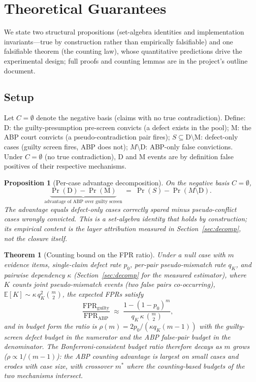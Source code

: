 \documentclass[11pt]{article}
\newtheorem{theorem}{Theorem}
\newtheorem{proposition}{Proposition}
\newcommand{\dd}{\mathrm{D}}
\newcommand{\mm}{\mathrm{M}}
\newcommand{\cset}{C}
\begin{document}
\section{Theoretical Guarantees}\label{sec:theory}

We state two structural propositions (set-algebra identities and
implementation invariants—true by construction rather than empirically
falsifiable) and one falsifiable theorem (the counting law), whose
quantitative predictions drive the experimental design; full proofs and
counting lemmas are in the project's outline document.

\subsection{Setup}

Let $\cset=\emptyset$ denote the negative basis (claims with no true
contradiction). Define:
$\dd$: the guilty-presumption pre-screen convicts (a defect exists in the
pool);
$\mm$: the ABP court convicts (a pseudo-contradiction pair fires);
$S\subseteq \dd\setminus\mm$: defect-only cases (guilty screen fires, ABP
does not);
$M{\setminus}\dd$: ABP-only false convictions.
Under $\cset=\emptyset$ (no true contradiction), $\dd$ and $\mm$ events are
by definition false positives of their respective mechanisms.

\begin{proposition}[Per-case advantage decomposition]\label{prop:decomp}
On the negative basis $\cset=\emptyset$,
\begin{equation}
\underbrace{\Pr(\dd)-\Pr(\mm)}_{\text{advantage of ABP over guilty screen}}
\;=\;\Pr(S)-\Pr(M{\setminus}\dd).
\end{equation}
The advantage equals defect-only cases correctly spared minus
pseudo-conflict cases wrongly convicted. This is a set-algebra identity
that holds by construction; its empirical content is the layer attribution
measured in Section~\ref{sec:decomp}, not the closure itself.
\end{proposition}

\begin{theorem}[Counting bound on the FPR ratio]\label{thm:counting}
Under a null case with $m$ evidence items, single-claim defect rate $p_0$,
per-pair pseudo-mismatch rate $q_K$, and pairwise dependency $\kappa$
(Section~\ref{sec:decomp} for the measured estimator), where $K$ counts
joint pseudo-mismatch events (two false pairs co-occurring),
$\mathbb{E}[K]\sim \kappa\, q_K^2 \binom{m}{2}$, the expected FPRs satisfy
\[
\frac{\mathrm{FPR}_{\text{guilty}}}{\mathrm{FPR}_{\text{ABP}}}
\;\approx\;
\frac{1-(1-p_0)^m}{q_K\,\kappa\,\binom{m}{2}} ,
\]
and in budget form the ratio is $\rho(m)=2p_0/(\kappa q_K (m-1))$ with the
guilty-screen defect budget in the numerator and the ABP false-pair budget
in the denominator. The Bonferroni-consistent budget ratio therefore
\emph{decays} as $m$ grows ($\rho\propto 1/(m-1)$): the ABP counting
advantage is largest on small cases and erodes with case size, with
crossover $m^\ast$ where the counting-based budgets of the two mechanisms
intersect.
\end{theorem}
\end{document}
